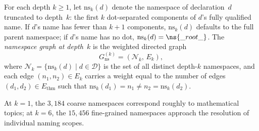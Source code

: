 \begin{definition}
\label{def:ns-graph}
For each depth $k \ge 1$, let $\mathrm{ns}_k(d)$ denote the namespace of declaration~$d$ truncated to depth~$k$: the first $k$ dot-separated components of $d$'s fully qualified name. If $d$'s name has fewer than $k+1$ components, $\mathrm{ns}_k(d)$ defaults to the full parent namespace; if $d$'s name has no dot, $\mathrm{ns}_k(d) = \ns{\_root\_}$. The \emph{namespace graph at depth~$k$} is the weighted directed graph
\[
  G_{\mathrm{ns}}^{(k)} = (\mathcal{N}_k,\, E_k),
\]
where $\mathcal{N}_k = \{\mathrm{ns}_k(d) \mid d \in \mathcal{D}\}$ is the set of all distinct depth-$k$ namespaces, and each edge $(n_1, n_2) \in E_k$ carries a weight equal to the number of edges $(d_1, d_2) \in E_{\mathrm{thm}}$ such that $\mathrm{ns}_k(d_1) = n_1 \neq n_2 = \mathrm{ns}_k(d_2)$.
\end{definition}

\noindent At $k=1$, the $3{,}184$ coarse namespaces correspond roughly to mathematical topics; at $k=6$, the $15{,}456$ fine-grained namespaces approach the resolution of individual naming scopes.

